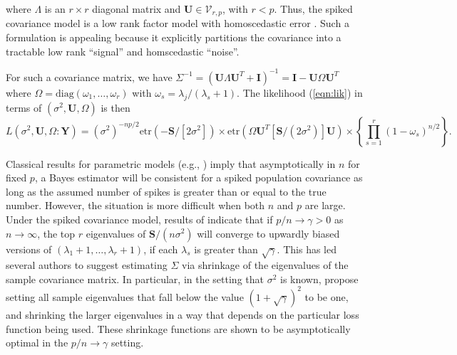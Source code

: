 \documentclass{article}
\newcommand{\bl}[1]{{\mathbf #1}}
\newcommand{\etr}{\text{etr}}
\begin{document}
where $\Lambda$ is an $r\times r$ diagonal matrix and 
$\bl U \in \mathcal V_{r,p}$, with 
$r<p$. Thus, the spiked covariance model is a low rank factor model
with homoscedastic error \citep{}.  Such a formulation is appealing because it explicitly
partitions the covariance into a tractable low rank ``signal'' and homscedastic ``noise''.  

For such a covariance matrix, we have
$\Sigma^{-1} = (\bl U \Lambda \bl U^T + \bl I )^{-1} = \bl I - \bl U
\Omega \bl U^T $
where $\Omega = \text{diag}(\omega_1,\ldots, \omega_r)$ with
$\omega_s = \lambda_j/(\lambda_s+1)$.  The likelihood (\ref{eqn:lik})
in terms of $(\sigma^2,\bl U, \Omega)$ is then
\begin{equation}
L(\sigma^2,\bl U , \Omega : \bl Y)  = 
(\sigma^2)^{-np/2} \etr(-\bl S/[2\sigma^2]) \times 
   \etr( \Omega \bl U^T [\bl S/(2\sigma^2)] \bl U ) \times  
 \left\{ \prod_{s=1}^r (1-\omega_s)^{n/2} \right \} .  
\label{eqn:rplik}
\end{equation}

Classical results for parametric models 
(e.g., \citet{schwartz_1965})  
imply that 
asymptotically in $n$ for fixed $p$, a Bayes estimator
will be consistent for a spiked  population covariance 
as long as the assumed number of spikes is greater than or equal to 
the true number. 
However, the situation is more difficult 
when both $n$ and $p$ are large.  
Under the spiked covariance model, 
results of 
\citet{Baik2006, Paul2007} indicate that if 
$p/n \rightarrow \gamma >0$ as $n\rightarrow \infty$,   
the top $r$ eigenvalues of $\bl S/(n\sigma^2)$ will converge 
to upwardly  biased versions of $(\lambda_1+1,\ldots, \lambda_r+1)$, 
if each $\lambda_s $ is greater than $\sqrt{\gamma}$.   
This has led several authors to suggest estimating 
$\Sigma$ via shrinkage of the eigenvalues of the sample covariance 
matrix. In particular, 
in the setting that $\sigma^2$ is known, 
\citet{Donoho2013} propose  
setting all sample eigenvalues that fall below 
the value $(1+\sqrt{\gamma})^2$ to be one, and shrinking the larger 
eigenvalues in a way that depends on the particular 
loss function being used. 
These shrinkage functions are shown to be asymptotically 
optimal in the $p/n\rightarrow \gamma$ setting. 
\end{document}

